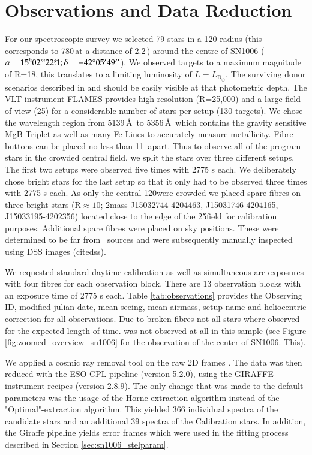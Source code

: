\section{Observations and Data Reduction}

For our spectroscopic survey we selected 79 stars in a 120 \arcsec radius (this corresponds to 780\,\kms at a distance of 2.2\,\kpc) around the centre of SN1006 ($\alpha = 15^h02^m22\overset{s}{.}1;\delta = -42^{\circ}05\hbox{$^\prime$}49\hbox{$^{\prime\prime}$}$). We observed targets to a maximum magnitude of R=18, this translates to a limiting luminosity of $L=L_{\textrm{R}_\odot}$. The surviving donor scenarios described in \citet{2000ApJS..128..615M} and \citet{2008A&A...489..943P} should be easily visible at that photometric depth. 
The VLT instrument FLAMES provides high resolution (R=25,000) and a large field of view (25\arcmin) for a considerable number of stars per setup (130 targets). We chose the wavelength region from 5139\,\AA\ to 5356\,\AA\ which contains the gravity sensitive MgB Triplet as well as many Fe-Lines to accurately measure metallicity. Fibre buttons can be placed no less than 11\arcsec\ apart. Thus to observe all of the program stars in the crowded central field, we split the stars over three different setups. The first two setups were observed five times with 2775 s each. We deliberately chose bright stars for the last setup so that it only had to be observed three times with 2775 s each. As only the central 120\arcsec were crowded we placed spare fibres on three bright stars (R$\approx 10$; 2mass J15032744-4204463, J15031746-4204165, J15033195-4202356) located close to the edge of the 25\arcmin field for calibration purposes. Additional spare fibres were placed on sky positions. These were determined to be far from \twomass\ sources and were subsequently manually inspected using DSS images (citedss). 

We requested standard daytime calibration as well as simultaneous arc exposures with four fibres for each observation block. There are 13 observation blocks with an exposure time of 2775 s each. Table \ref{tab:observations} provides the Observing ID, modified julian date, mean seeing, mean airmass, setup name and heliocentric correction for all observations. Due to broken fibres not all stars where observed for the expected length of time.  was not observed at all in this sample (see Figure \ref{fig:zoomed_overview_sn1006} for the observation of the center of SN1006. This).

We applied a cosmic ray removal tool on the raw 2D frames \citep{2001PASP..113.1420V}. The data was then reduced with the ESO-CPL pipeline (version 5.2.0), using the GIRAFFE instrument recipes (version 2.8.9). The only change that was made to the default parameters was the usage of the Horne extraction algorithm instead of the "Optimal"-extraction algorithm. This yielded 366 individual spectra of the candidate stars and an additional 39 spectra of the Calibration stars. 
In addition, the Giraffe pipeline yields error frames which were used in the fitting process described in Section \ref{sec:sn1006_stelparam}. 


